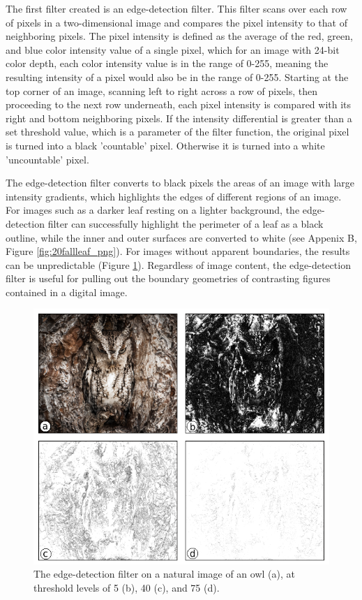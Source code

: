 \documentclass[12pt, oneside]{book}
\begin{document}
The first filter created is an edge-detection filter.  This filter scans over each row of pixels in a two-dimensional image and compares the pixel intensity to that of neighboring pixels.  The pixel intensity is defined as the average of the red, green, and blue color intensity value of a single pixel, which for an image with 24-bit color depth, each color intensity value is in the range of 0-255, meaning the resulting intensity of a pixel would also be in the range of 0-255. Starting at the top corner of an image, scanning left to right across a row of pixels, then proceeding to the next row underneath, each pixel intensity is compared with its right and bottom neighboring pixels.  If the intensity differential is greater than a set threshold value, which is a parameter of the filter function, the original pixel is turned into a black 'countable' pixel.  Otherwise it is turned into a white 'uncountable' pixel.   

The edge-detection filter converts to black pixels the areas of an image with large intensity gradients, which highlights the edges of different regions of an image.  For images such as a darker leaf resting on a lighter background, the edge-detection filter can successfully highlight the perimeter of a leaf as a black outline, while the inner and outer surfaces are converted to white (see Appenix B, Figure \ref{fig:20fallleaf_png}). For images without apparent boundaries, the results can be unpredictable (Figure \ref{fig:edfilter}).  Regardless of image content, the edge-detection filter is useful for pulling out the boundary geometries of contrasting figures contained in a digital image.

\begin{figure}[!b]
  \centering
  \includegraphics[width=\textwidth]{figures/owl_ed.png}
  \caption[The edge-detection filter on a natural image of an owl]{The edge-detection filter on a natural image of an owl (a), at threshold levels of 5 (b), 40 (c), and 75 (d).}
  \label{fig:edfilter}
\end{figure} 
\end{document}
